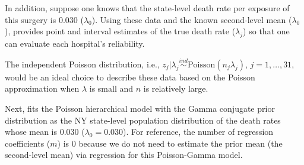 \documentclass[article]{jss}
\begin{document}
In addition, suppose one knows that the state-level death rate per exposure of this surgery is 0.030 ($\lambda_{0}$). Using these data and the known second-level mean ($\lambda_{0}$),  provides point and interval estimates of the true death rate ($\lambda_{j}$) so that one can evaluate each hospital's reliability. 


The independent Poisson distribution, i.e.,  $z_{j}\vert \lambda_{j}\stackrel{ind}{\sim} \textrm{Poisson}(n_{j}\lambda_{j})$, $j=1, \ldots, 31,$ would be an ideal choice to describe these data based on the Poisson approximation when $\lambda$ is small and $n$ is relatively large. 


Next,  fits the Poisson hierarchical model with the Gamma conjugate prior distribution as the NY state-level population distribution of the death rates whose mean is 0.030 ($\lambda_{0}=0.030$). For reference, the number of regression coefficients ($m$) is 0 because we do not need to estimate the prior mean (the second-level mean) via regression for this Poisson-Gamma model. 
\end{document}
